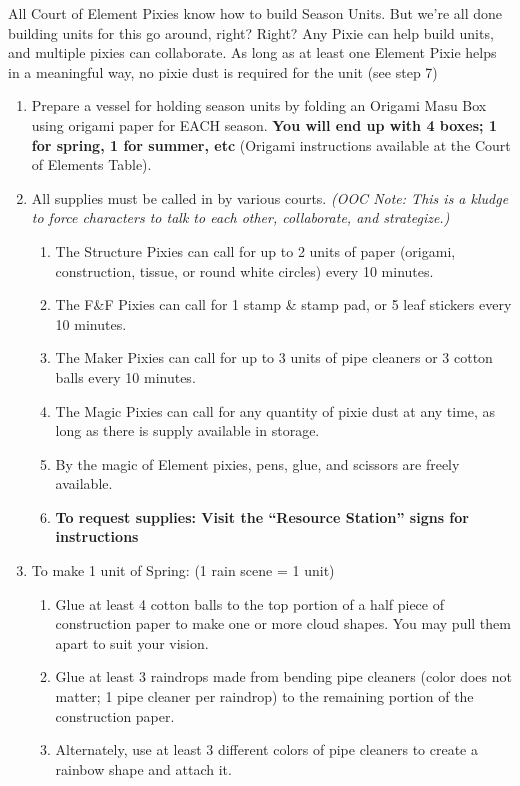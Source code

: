 \documentclass[green]{PP}
\begin{document}
\name{\gSesons{}}

All Court of Element Pixies know how to build Season Units. But we’re all done building units for this go around, right? Right? Any Pixie can help build units, and multiple pixies can collaborate. As long as at least one Element Pixie helps in a meaningful way, no pixie dust is required for the unit (see step 7)

\begin{enumerate}
	\item Prepare a vessel for holding season units by folding an Origami Masu Box using origami paper for EACH season. \textbf{You will end up with 4 boxes; 1 for spring, 1 for summer, etc} (Origami instructions available at the Court of Elements Table).
	\item All supplies must be called in by various courts. \textit{(OOC Note: This is a kludge to force characters to talk to each other, collaborate, and strategize.)}
	\begin{enumerate}
		\item The Structure Pixies can call for up to 2 units of paper (origami, construction, tissue, or round white circles) every 10 minutes.
		\item The F\&F Pixies can call for 1 stamp \& stamp pad, or 5 leaf stickers every 10 minutes.
		\item The Maker Pixies can call for up to 3 units of pipe cleaners or 3 cotton balls every 10 minutes.
		\item The Magic Pixies can call for any quantity of pixie dust at any time, as long as there is supply available in storage.
		\item By the magic of Element pixies, pens, glue, and scissors are freely available.
		\item \textbf{To request supplies: Visit the ``Resource Station'' signs for instructions}
	\end{enumerate}
	\item To make 1 unit of Spring: (1 rain scene = 1 unit)
	\begin{enumerate}
		\item Glue at least 4 cotton balls to the top portion of a half piece of construction paper to make one or more cloud shapes. You may pull them apart to suit your vision.
		\item Glue at least 3 raindrops made from bending pipe cleaners (color does not matter; 1 pipe cleaner per raindrop) to the remaining portion of the construction paper.
		\item Alternately, use at least 3 different colors of pipe cleaners to create a rainbow shape and attach it.

\end{enumerate}
\end{enumerate}
\end{document}

